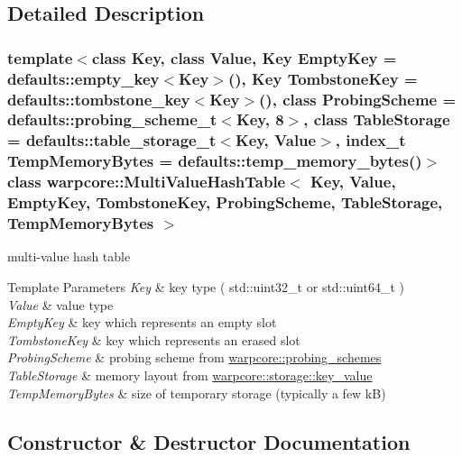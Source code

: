 \subsection{Detailed Description}
\subsubsection*{template$<$class Key, class Value, Key Empty\+Key = defaults\+::empty\+\_\+key$<$\+Key$>$(), Key Tombstone\+Key = defaults\+::tombstone\+\_\+key$<$\+Key$>$(), class Probing\+Scheme = defaults\+::probing\+\_\+scheme\+\_\+t$<$\+Key, 8$>$, class Table\+Storage = defaults\+::table\+\_\+storage\+\_\+t$<$\+Key, Value$>$, index\+\_\+t Temp\+Memory\+Bytes = defaults\+::temp\+\_\+memory\+\_\+bytes()$>$\newline
class warpcore\+::\+Multi\+Value\+Hash\+Table$<$ Key, Value, Empty\+Key, Tombstone\+Key, Probing\+Scheme, Table\+Storage, Temp\+Memory\+Bytes $>$}

multi-\/value hash table 


\begin{DoxyTemplParams}{Template Parameters}
{\em Key} & key type ( {\ttfamily std\+::uint32\+\_\+t} or {\ttfamily std\+::uint64\+\_\+t} ) \\
\hline
{\em Value} & value type \\
\hline
{\em Empty\+Key} & key which represents an empty slot \\
\hline
{\em Tombstone\+Key} & key which represents an erased slot \\
\hline
{\em Probing\+Scheme} & probing scheme from {\ttfamily \hyperlink{namespacewarpcore_1_1probing__schemes}{warpcore\+::probing\+\_\+schemes}} \\
\hline
{\em Table\+Storage} & memory layout from {\ttfamily \hyperlink{namespacewarpcore_1_1storage_1_1key__value}{warpcore\+::storage\+::key\+\_\+value}} \\
\hline
{\em Temp\+Memory\+Bytes} & size of temporary storage (typically a few kB) \\
\hline
\end{DoxyTemplParams}


\subsection{Constructor \& Destructor Documentation}
\mbox{\label{classwarpcore_1_1MultiValueHashTable_acbcf649a55f735827a3729bdcd5493d1}} 
